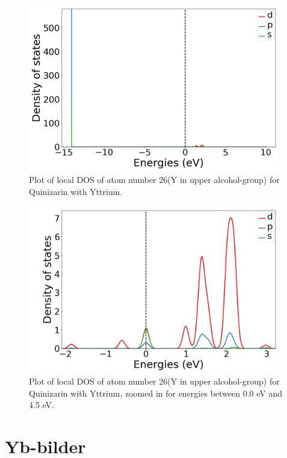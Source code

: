 \documentclass{article}
\begin{document}
  \begin{figure}[H]
      \centering
      \includegraphics[width = 11cm]{../fig/Y_LDOS26_1.png}
      \caption{Plot of local DOS of atom number 26(Y in upper alcohol-group) for Quinizarin with Yttrium. }
      \label{fig:Y_LDOS26_1.png}
  \end{figure}

  \begin{figure}[H]
      \centering
      \includegraphics[width = 11cm]{../fig/Y_LDOS26_2.png}
      \caption{Plot of local DOS of atom number 26(Y in upper alcohol-group) for Quinizarin with Yttrium, zoomed in for energies between 0.0 eV and 4.5 eV. }
      \label{fig:Y_LDOS26_2.png}
  \end{figure}

\vspace{1cm}

\section{Yb-bilder}
\end{document}

